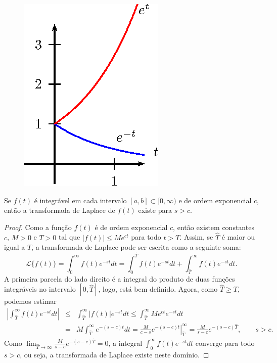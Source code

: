 \begin{ex}
\begin{figure}[!ht]
\begin{center}
\includegraphics{cap_definicao/pics/figura_3}\end{center}
\caption{\label{ordem_exp}}
\end{figure}
\end{ex}
\begin{teo}\label{ordem_exp_exist} Se $f(t)$ é integrável em cada intervalo $[a,b]\subset[0,\infty)$ e de ordem exponencial $c$, então a transformada de Laplace de $f(t)$ existe para $s>c$.
\end{teo}
\begin{proof}Como a função $f(t)$ é de ordem exponencial $c$, então existem constantes $c$, $M>0$ e $T>0$ tal que $|f(t)|\leq M e^{ct}$ para todo $t>T$. Assim, se $\hat{T}$ é maior ou igual a $T$, a transformada de Laplace  pode ser escrita como a seguinte soma:
$$
\mathcal{L}\{f(t)\}=\int_0^\infty f(t)e^{-st}dt=\int_0^{\hat{T}} f(t)e^{-st}dt+\int_{\hat{T}}^\infty f(t)e^{-st}dt.
$$
A primeira parcela do lado direito é a integral do produto de duas funções integráveis no intervalo $[0, \hat{T}]$, logo, está bem definido. Agora, como $\hat{T}\geq T$, podemos estimar
\begin{eqnarray*}
\left|\int_{\hat{T}}^\infty f(t)e^{-st}dt\right|&\leq& \int_{\hat{T}}^\infty \left|f(t)\right|e^{-st}dt\leq \int_{\hat{T}}^\infty M e^{ct}e^{-st}dt\\
&=&M \int_{\hat{T}}^\infty e^{-(s-c)t}dt
=\left.\frac{M}{c-s} e^{-(s-c)t}\right|_{\hat{T}}^\infty =\frac{M}{s-c}e^{-(s-c)\hat{T}} ,\qquad s>c.
\end{eqnarray*}
Como $\lim_{\hat{T}\to \infty} \frac{M}{s-c}e^{-(s-c)\hat{T}}=0$, a integral $\int_0^\infty f(t)e^{-st}dt$ converge para todo $s>c$, ou seja, a transformada de Laplace existe neste domínio.
\end{proof}
